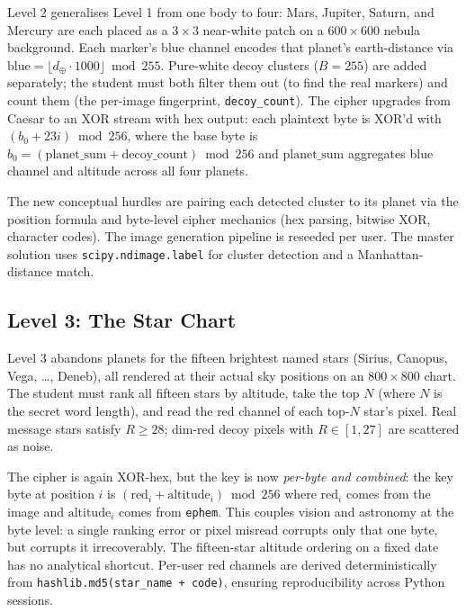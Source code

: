 \documentclass[10pt,twocolumn]{article}
\begin{document}
Level 2 generalises Level 1 from one body to four: Mars, Jupiter, Saturn, and Mercury are each placed as a $3 \times 3$ near-white patch on a $600 \times 600$ nebula background. Each marker's blue channel encodes that planet's earth-distance via $\text{blue} = \lfloor d_{\oplus} \cdot 1000 \rfloor \bmod 255$. Pure-white decoy clusters ($B = 255$) are added separately; the student must both filter them out (to find the real markers) and count them (the per-image fingerprint, \texttt{decoy\_count}). The cipher upgrades from Caesar to an XOR stream with hex output: each plaintext byte is XOR'd with $(b_0 + 23i) \bmod 256$, where the base byte is $b_0 = (\text{planet\_sum} + \text{decoy\_count}) \bmod 256$ and $\text{planet\_sum}$ aggregates blue channel and altitude across all four planets.

The new conceptual hurdles are pairing each detected cluster to its planet via the position formula and byte-level cipher mechanics (hex parsing, bitwise XOR, character codes). The image generation pipeline is reseeded per user. The master solution uses \texttt{scipy.ndimage.label} for cluster detection and a Manhattan-distance match.

\subsection{Level 3: The Star Chart}

Level 3 abandons planets for the fifteen brightest named stars (Sirius, Canopus, Vega, \ldots, Deneb), all rendered at their actual sky positions on an $800 \times 800$ chart. The student must rank all fifteen stars by altitude, take the top $N$ (where $N$ is the secret word length), and read the red channel of each top-$N$ star's pixel. Real message stars satisfy $R \geq 28$; dim-red decoy pixels with $R \in [1, 27]$ are scattered as noise.

The cipher is again XOR-hex, but the key is now \emph{per-byte and combined}: the key byte at position $i$ is $(\text{red}_i + \text{altitude}_i) \bmod 256$ where $\text{red}_i$ comes from the image and $\text{altitude}_i$ comes from \texttt{ephem}. This couples vision and astronomy at the byte level: a single ranking error or pixel misread corrupts only that one byte, but corrupts it irrecoverably. The fifteen-star altitude ordering on a fixed date has no analytical shortcut. Per-user red channels are derived deterministically from \texttt{hashlib.md5(star\_name + code)}, ensuring reproducibility across Python sessions.
\end{document}
